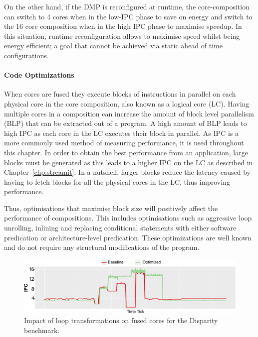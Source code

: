 On the other hand, if the DMP is reconfigured at runtime, the core-composition can switch to 4 cores when in the low-IPC phase to save on energy and switch to the 16 core composition when in the high IPC phase to maximise speedup.
In this situation, runtime reconfiguration allows to maximise speed whilst being energy efficient; a goal that cannot be achieved via static ahead of time configurations.

\paragraph{Code Optimizations}

When cores are fused they execute blocks of instructions in parallel on each physical core in the core composition, also known as a logical core (LC).
Having multiple cores in a composition can increase the amount of block level parallelism (BLP) that can be extracted out of a program.
A high amount of BLP leads to high IPC as each core in the LC executes their block in parallel.
As IPC is a more commonly used method of measuring performance, it is used throughout this chapter.
In order to obtain the best performance from an application, large blocks must be generated as this leads to a higher IPC on the LC as described in Chapter~\ref{chp:streamit}.
In a nutshell, larger blocks reduce the latency caused by having to fetch blocks for all the physical cores in the LC, thus improving performance.

Thus, optimisations that maximise block size will positively affect the performance of compositions.
This includes optimisations such as aggressive loop unrolling, inlining and replacing conditional statements with either software predication or architecture-level predication.
These optimizations are well known and do not require any structural modifications of the program.

\begin{figure}[t]
    \includegraphics[width=\textwidth]{cases-paper/graphics/motivation/code_opt_3.pdf}
    \caption{Impact of loop transformations on fused cores for the Disparity benchmark.} 
    \label{fig:compmotiv}
\vspace{1em}
\end{figure}

